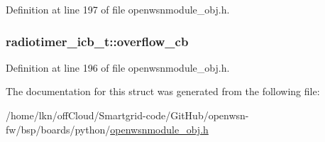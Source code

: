 Definition at line 197 of file openwsnmodule\+\_\+obj.\+h.

\subsubsection[{\texorpdfstring{overflow\+\_\+cb}{overflow_cb}}]{ radiotimer\+\_\+icb\+\_\+t\+::overflow\+\_\+cb}\hypertarget{structradiotimer__icb__t_ab4d3372f5885f14bd9635759c00ce457}{}\label{structradiotimer__icb__t_ab4d3372f5885f14bd9635759c00ce457}


Definition at line 196 of file openwsnmodule\+\_\+obj.\+h.



The documentation for this struct was generated from the following file\+:\begin{DoxyCompactItemize}
\item 
/home/lkn/off\+Cloud/\+Smartgrid-\/code/\+Git\+Hub/openwsn-\/fw/bsp/boards/python/\hyperlink{openwsnmodule__obj_8h}{openwsnmodule\+\_\+obj.\+h}\end{DoxyCompactItemize}
